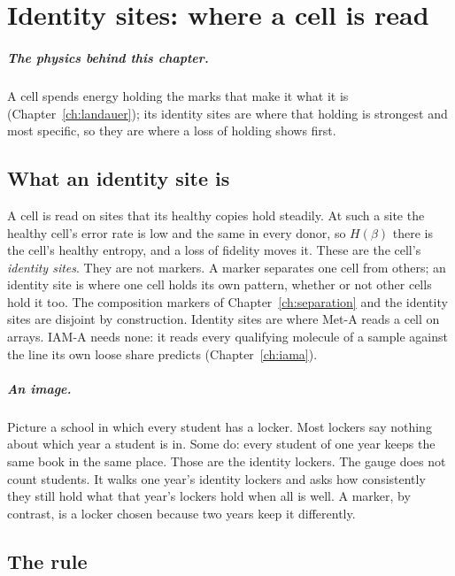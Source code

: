\chapter{Identity sites: where a cell is read}\label{ch:identity}

\paragraph{The physics behind this chapter.} A cell spends energy holding the marks that make it what it is (Chapter~\ref{ch:landauer}); its identity sites are where that holding is strongest and most specific, so they are where a loss of holding shows first.

\section{What an identity site is}

A cell is read on sites that its healthy copies hold steadily. At such a site the healthy cell's error rate is low and the same in every
donor, so $H(\beta)$ there is the cell's healthy entropy, and a loss of fidelity moves it. These are the cell's \emph{identity sites}. They are
not markers. A marker separates one cell from others; an identity site is where one cell holds its own pattern, whether or not other cells
hold it too. The composition markers of Chapter~\ref{ch:separation} and the identity sites are disjoint by construction.
Identity sites are where Met-A reads a cell on arrays. IAM-A needs none: it reads every qualifying molecule of a sample against the line its own
loose share predicts (Chapter~\ref{ch:iama}).

\paragraph{An image.} Picture a school in which every student has a locker. Most lockers say nothing about which year a student is
in. Some do: every student of one year keeps the same book in the same place. Those are the identity lockers. The gauge does not
count students. It walks one year's identity lockers and asks how consistently they still hold what that year's lockers hold when
all is well. A marker, by contrast, is a locker chosen because two years keep it differently. \analogy

\section{The rule}

